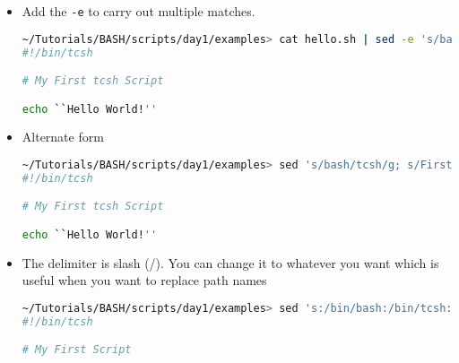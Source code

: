 \documentclass[slidestop,mathserif,compress,xcolor=svgnames]{beamer}
\begin{document}
\begin{frame}
{\begin{itemize}
\begin{columns}
\begin{center}
      \end{center} 
    \end{columns}
    \item Add the \texttt{-e} to carry out multiple matches.
      \begin{lstlisting}[language=bash]
~/Tutorials/BASH/scripts/day1/examples> cat hello.sh | sed -e 's/bash/tcsh/g' -e 's/First/First tcsh/g'
#!/bin/tcsh

# My First tcsh Script

echo ``Hello World!''
      \end{lstlisting}
    \item Alternate form
      \begin{lstlisting}[language=bash]
~/Tutorials/BASH/scripts/day1/examples> sed 's/bash/tcsh/g; s/First/First tcsh/g' hello.sh 
#!/bin/tcsh

# My First tcsh Script

echo ``Hello World!''
      \end{lstlisting}
    \item The delimiter is slash (/). You can change it to whatever you want which is useful when you want to replace path names
      \begin{lstlisting}[language=bash]
~/Tutorials/BASH/scripts/day1/examples> sed 's:/bin/bash:/bin/tcsh:g' hello.sh 
#!/bin/tcsh

# My First Script


\end{lstlisting}
\end{itemize}}
\end{frame}
\end{document}
